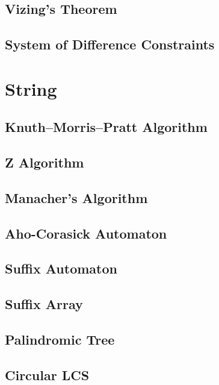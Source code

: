 \documentclass[a4paper,10pt,twocolumn,oneside]{article}
\begin{document}
\subsection{Vizing's Theorem}

% 
\subsection{System of Difference Constraints}

\section{String}
\subsection{Knuth–Morris–Pratt Algorithm}

\subsection{Z Algorithm}

\subsection{Manacher's Algorithm}

\subsection{Aho-Corasick Automaton}

\subsection{Suffix Automaton}

\subsection{Suffix Array}

\subsection{Palindromic Tree}

\subsection{Circular LCS}

% 
% 
\end{document}
